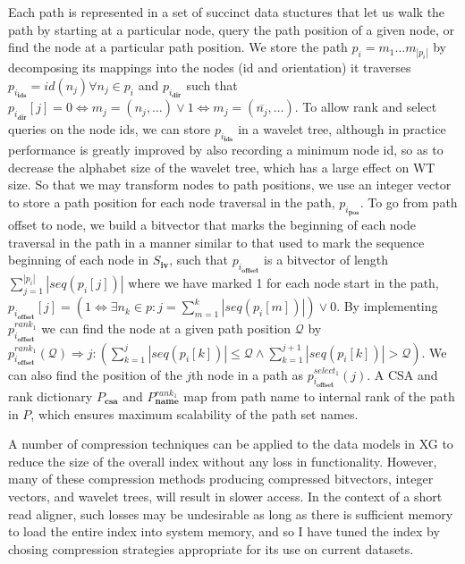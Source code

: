 Each path is represented in a set of succinct data stuctures that let us walk the path by starting at a particular node, query the path position of a given node, or find the node at a particular path position.
We store the path $p_i = m_1 \ldots m_{|p_i|}$ by decomposing its mappings into the nodes (id and orientation) it traverses $p_{i_\textbf{ids}} = id(n_j) \forall n_j \in p_i$ and $p_{i_\textbf{dir}}$ such that $p_{i_\textbf{dir}}[j] = 0 \iff m_j = (n_j, \ldots) \lor 1 \iff m_j = (\overline{n_j}, \ldots)$.
To allow rank and select queries on the node ids, we can store $p_{i_\textbf{ids}}$ in a wavelet tree, although in practice performance is greatly improved by also recording a minimum node id, so as to decrease the alphabet size of the wavelet tree, which has a large effect on WT size.
So that we may transform nodes to path positions, we use an integer vector to store a path position for each node traversal in the path, $p_{i_\textbf{pos}}$.
To go from path offset to node, we build a bitvector that marks the beginning of each node traversal in the path in a manner similar to that used to mark the sequence beginning of each node in $S_\textbf{iv}$, such that $p_{i_\textbf{offset}}$ is a bitvector of length $\sum_{j=1}^{|p_i|} |seq(p_i[j])|$ where we have marked 1 for each node start in the path, $p_{i_\textbf{offset}}[j] = \left( 1 \iff \exists n_k \in p : j = \sum_{m=1}^{k} |seq(p_i[m])| \right) \lor 0$.
By implementing $p_{i_\textbf{offset}}^{rank_1}$ we can find the node at a given path position $\mathcal{Q}$ by $p_{i_\textbf{offset}}^{rank_1}(\mathcal{Q}) \Rightarrow j : \left( \sum_{k=1}^{j} |seq(p_i[k])| \leq \mathcal{Q} \land \sum_{k=1}^{j+1} |seq(p_i[k])| > \mathcal{Q} \right)$.
We can also find the position of the $j$th node in a path as $p_{i_\textbf{offset}}^{select_1}(j)$.
A CSA and rank dictionary $P_\textbf{csa}$ and $P_\textbf{name}^{rank_1}$ map from path name to internal rank of the path in $P$, which ensures maximum scalability of the path set names.

A number of compression techniques can be applied to the data models in XG to reduce the size of the overall index without any loss in functionality.
However, many of these compression methods producing compressed bitvectors, integer vectors, and wavelet trees, will result in slower access.
In the context of a short read aligner, such losses may be undesirable as long as there is sufficient memory to load the entire index into system memory, and so I have tuned the index by chosing compression strategies appropriate for its use on current datasets.

